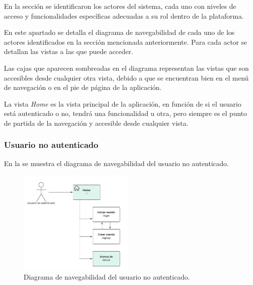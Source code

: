 En la sección  se identificaron los actores del sistema,
cada uno con niveles de acceso y funcionalidades específicas adecuadas a su rol dentro de la plataforma. 

En este apartado se detalla el diagrama de navegabilidad de cada uno de los actores identificados en la sección mencionada anteriormente.
Para cada actor se detallan las vistas a las que puede acceder.

Las cajas que aparecen sombreadas en el diagrama representan las vistas que son accesibles desde cualquier otra vista,
debido a que se encuentran bien en el menú de navegación o en el pie de página de la aplicación.

La vista \textit{Home} es la vista principal de la aplicación, en función de si el usuario está autenticado o no, tendrá
una funcionalidad u otra, pero siempre es el punto de partida de la navegación y accesible desde cualquier vista.


\subsubsection{Usuario no autenticado}
En la  se muestra el diagrama de navegabilidad del usuario no autenticado.

\begin{figure}[H]
    \centering
    \includegraphics[width=0.5\textwidth]{figures/6-Analisis/6-Interfaz/navegabilidad-guest.png}
    \caption{Diagrama de navegabilidad del usuario no autenticado.}
    \hypertarget{fig:navegabilidad-usuario-no-autenticado}{}
    \label{fig:navegabilidad-usuario-no-autenticado}
\end{figure}

